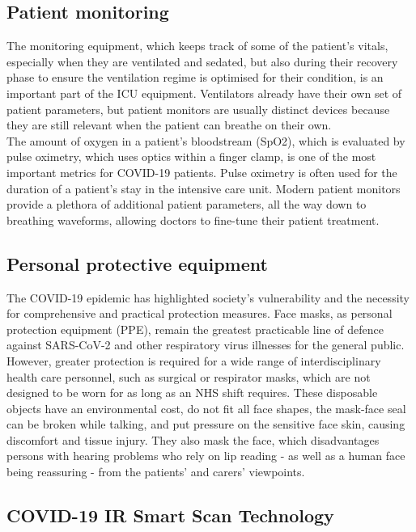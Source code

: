 \documentclass[12pt]{article}
\begin{document}
\begin{flushleft}
\subsection{Patient monitoring}
The monitoring equipment, which keeps track of some of the patient's vitals, especially when they are ventilated and sedated, but also during their recovery phase to ensure the ventilation regime is optimised for their condition, is an important part of the ICU equipment. Ventilators already have their own set of patient parameters, but patient monitors are usually distinct devices because they are still relevant when the patient can breathe on their own.\\
[0.9cm]
The amount of oxygen in a patient's bloodstream (SpO2), which is evaluated by pulse oximetry, which uses optics within a finger clamp, is one of the most important metrics for COVID-19 patients. Pulse oximetry is often used for the duration of a patient's stay in the intensive care unit. Modern patient monitors provide a plethora of additional patient parameters, all the way down to breathing waveforms, allowing doctors to fine-tune their patient treatment.\\
[.75cm]
\subsection{Personal protective equipment}
The COVID-19 epidemic has highlighted society's vulnerability and the necessity for comprehensive and practical protection measures. Face masks, as personal protection equipment (PPE), remain the greatest practicable line of defence against SARS-CoV-2 and other respiratory virus illnesses for the general public.\\
[0.9cm]
However, greater protection is required for a wide range of interdisciplinary health care personnel, such as surgical or respirator masks, which are not designed to be worn for as long as an NHS shift requires. These disposable objects have an environmental cost, do not fit all face shapes, the mask-face seal can be broken while talking, and put pressure on the sensitive face skin, causing discomfort and tissue injury. They also mask the face, which disadvantages persons with hearing problems who rely on lip reading - as well as a human face being reassuring - from the patients' and carers' viewpoints.\\
[0.75cm]




\subsection{COVID-19 IR Smart Scan Technology}



\end{flushleft}
\end{document}
